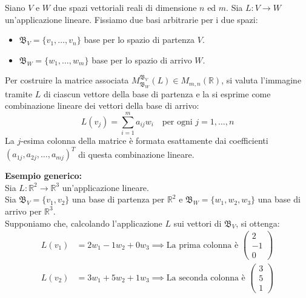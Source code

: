         \begin{richiamo}
        Siano $V$ e $W$ due spazi vettoriali reali di dimensione $n$ ed $m$.
        Sia $L: V \to W$ un'applicazione lineare. 
        Fissiamo due basi arbitrarie per i due spazi:
        \begin{itemize}
            \item $\mathfrak{B}_V = \{v_1, \dots, v_n\}$ base per lo spazio di partenza $V$.
            \item $\mathfrak{B}_W = \{w_1, \dots, w_m\}$ base per lo spazio di arrivo $W$.
        \end{itemize}

        Per costruire la matrice associata $M_{\mathfrak{B}_W}^{\mathfrak{B}_V}(L) \in M_{m,n}(\mathbb{R})$, si valuta l'immagine tramite $L$ di ciascun vettore della base di partenza e la si esprime come combinazione lineare dei vettori della base di arrivo:
        \[
        L(v_j) = \sum_{i=1}^m a_{ij} w_i \quad \text{per ogni } j = 1, \dots, n
        \]
        La $j$-esima colonna della matrice è formata esattamente dai coefficienti $(a_{1j}, a_{2j}, \dots, a_{mj})^T$ di questa combinazione lineare.

        \vspace{0.3cm}
        \textbf{Esempio generico:} \\
        Sia $L: \mathbb{R}^2 \to \mathbb{R}^3$ un'applicazione lineare. \\
        Sia $\mathfrak{B}_V = \{v_1, v_2\}$ una base di partenza per $\mathbb{R}^2$ e $\mathfrak{B}_W = \{w_1, w_2, w_3\}$ una base di arrivo per $\mathbb{R}^3$. \\
        Supponiamo che, calcolando l'applicazione $L$ sui vettori di $\mathfrak{B}_V$, si ottenga:
        \begin{align*}
        L(v_1) &= 2w_1 - 1w_2 + 0w_3 \implies \text{La prima colonna è } \begin{pmatrix} 2 \\ -1 \\ 0 \end{pmatrix} \\
        L(v_2) &= 3w_1 + 5w_2 + 1w_3 \implies \text{La seconda colonna è } \begin{pmatrix} 3 \\ 5 \\ 1 \end{pmatrix}
        \end{align*}


\end{richiamo}
